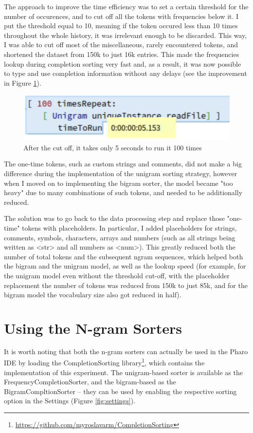The approach to improve the time efficiency was to set a certain threshold for the number of occurences, and to cut off all the tokens with frequencies below it. I put the threshold equal to 10, meaning if the token occured less than 10 times throughout the whole history, it was irrelevant enough to be discarded. This way, I was able to cut off most of the miscellaneous, rarely encountered tokens, and shortened the dataset from 150k to just 16k entries. This made the frequencies lookup during completion sorting very fast and, as a result, it was now possible to type and use completion information without any delays (see the improvement in Figure \ref{fig:sorterFast}).

\begin{figure}[H]
    \centering
    \includegraphics[width=0.9\linewidth]{images/unigramTimeToRunFast.png}
    \caption{After the cut off, it takes only 5 seconds to run it 100 times}
    \label{fig:sorterFast}
\end{figure}

The one-time tokens, such as custom strings and comments, did not make a big difference during the implementation of the unigram sorting strategy, however when I moved on to implementing the bigram sorter, the model became "too heavy" due to many combinations of such tokens, and needed to be additionally reduced.

The solution was to go back to the data processing step and replace those "one-time" tokens with placeholders. In particular, I added placeholders for strings, comments, symbols, characters, arrays and numbers (such as all strings being written as <str> and all numbers as <num>). This greatly reduced both the number of total tokens and the subsequent ngram sequences, which helped both the bigram and the unigram model, as well as the lookup speed (for example, for the unigram model even without the threshold cut-off, with the placeholder replacement the number of tokens was reduced from 150k to just 85k, and for the bigram model the vocabulary size also got reduced in half).

\section{Using the N-gram Sorters}
\label{sec:ProposedSolution-Usage}
It is worth noting that both the n-gram sorters can actually be used in the Pharo IDE by loading the CompletionSorting library\footnote{\url{https://github.com/myroslavarm/CompletionSorting}}, which contains the implementation of this experiment. The unigram-based sorter is available as the FrequencyCompletionSorter, and the bigram-based as the BigramCompltionSorter -- they can be used by enabling the respective sorting option in the Settings (Figure \ref{fig:settings}).


